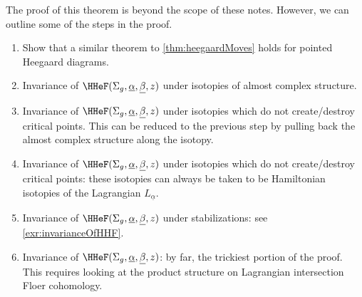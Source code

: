 

The proof of this theorem is beyond the scope of these notes. However, we can outline some of the steps in the proof. 
\begin{enumerate}
    \item Show that a similar theorem to \cref{thm:heegaardMoves} holds for pointed Heegaard diagrams.
    \item Invariance of $\HHeF(\Sigma_g, \underline \alpha, \underline \beta, z)$ under isotopies of almost complex structure. 
    \item Invariance of $\HHeF(\Sigma_g,\underline \alpha, \underline \beta,z)$ under isotopies which do not create/destroy critical points. This can be reduced to the previous step by pulling back the almost complex structure along the isotopy.
    \item  Invariance of $\HHeF(\Sigma_g,\underline \alpha, \underline \beta,z)$ under isotopies which do not create/destroy critical points: these isotopies can always be taken to be Hamiltonian isotopies of the Lagrangian $L_{\underline \alpha}$. 
    \item Invariance of $\HHeF(\Sigma_g,\underline \alpha, \underline \beta,z)$ under stabilizations: see \cref{exr:invarianceOfHHF}.
    \item Invariance of $\HHeF(\Sigma_g,\underline \alpha, \underline \beta,z)$: by far, the trickiest portion of the proof. This requires looking at the product structure on Lagrangian intersection Floer cohomology.
\end{enumerate}